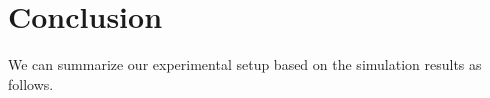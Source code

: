 \documentclass[12pt,a4paper]{article}
\newcommand{\convexBase}{../../../Results/Convex_combination}
\begin{document}
		
		
		
		


\section{Conclusion}
We can summarize our experimental setup based on the simulation results as follows.
\end{document}
